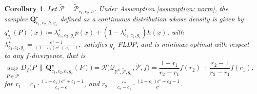 \documentclass[accepted]{article}
\theoremstyle{plain} %
\newtheorem{corollary}[theorem]{Corollary}
\theoremstyle{definition}
\theoremstyle{remark}
\newcommand{\eps}{\varepsilon}
\newcommand{\bQ}{\mathbf{Q}}
\newcommand{\SA}[1]{\textbf{\textcolor{Magenta}{[#1]}}}
\newcommand{\HG}[1]{\textcolor{cyan}{[#1]}}
\begin{document}
\begin{corollary}\label{cor: special case of f-LDP}
Let $\tilde{\mathcal{P}}=\tilde{\mathcal{P}}_{c_1,c_2,h}$. Under Assumption \ref{assumption: norm}, the sampler $\mathbf{Q}_{c_1,c_2,h,g_\eps}^\star$ defined as a continuous distribution whose density is given by
   $q^\star_{g_\eps}(P) (x)\coloneqq \lambda^\star_{c_1,c_2,g_\eps} p(x) + \left(1 - \lambda^\star_{c_1,c_2,g_\eps}\right) h(x)$, with $ \lambda^\star_{c_1,c_2,g_\eps} = \frac{e^\varepsilon - 1}{(1 - c_1)e^\varepsilon + c_2 - 1},
$
satisfies $g_\eps$-FLDP, and is minimax-optimal with respect to any \( f \)-divergence, that is
\begin{equation}\label{eqn: continuous global functional optimal value g_eps}
    \sup_{P \in \tilde{\mathcal{P}}} D_f\big(P \,\|\, \bQ^\star_{c_1,c_2,h,g_\eps}(P)\big)
    = \mathcal{R}\big(\mathcal{Q}_{\mathbb{R}^n, \tilde{\mathcal{P}}, g_\eps}, \tilde{\mathcal{P}}, f\big)
    = \frac{1 - r_1}{r_2 - r_1} f(r_2) + \frac{r_2 - 1}{r_2 - r_1} f(r_1),
\end{equation}
for $
r_1 = c_1 \cdot \frac{(1 - c_1)e^{\eps} + c_2 - 1}{c_2 - c_1 }$, and $
r_2 = \frac{c_2}{c_2 - c_1} \cdot \frac{(1 - c_1)e^{\eps} + c_2 - 1}{e^{\eps}}$.
\end{corollary} 
\end{document}
